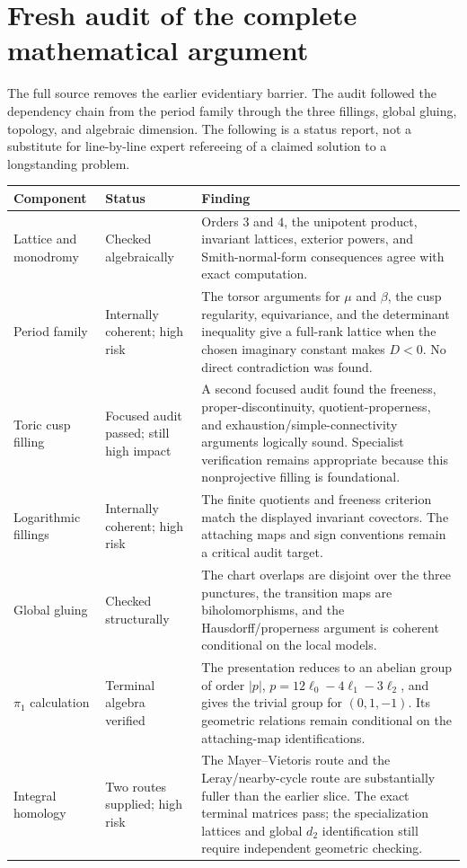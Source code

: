\documentclass[11pt]{article}
\begin{document}
\section{Fresh audit of the complete mathematical argument}

The full source removes the earlier evidentiary barrier. The audit followed the dependency chain from the period family through the three fillings, global gluing, topology, and algebraic dimension. The following is a status report, not a substitute for line-by-line expert refereeing of a claimed solution to a longstanding problem.

\begin{longtable}{@{}p{}p{}p{}@{}}
\toprule
Component & Status & Finding \\
\midrule
\endhead
Lattice and monodromy & Checked algebraically & Orders $3$ and $4$, the unipotent product, invariant lattices, exterior powers, and Smith-normal-form consequences agree with exact computation. \\
Period family & Internally coherent; high risk & The torsor arguments for $\mu$ and $\beta$, the cusp regularity, equivariance, and the determinant inequality give a full-rank lattice when the chosen imaginary constant makes $D<0$. No direct contradiction was found. \\
Toric cusp filling & Focused audit passed; still high impact & A second focused audit found the freeness, proper-discontinuity, quotient-properness, and exhaustion/simple-connectivity arguments logically sound. Specialist verification remains appropriate because this nonprojective filling is foundational. \\
Logarithmic fillings & Internally coherent; high risk & The finite quotients and freeness criterion match the displayed invariant covectors. The attaching maps and sign conventions remain a critical audit target. \\
Global gluing & Checked structurally & The chart overlaps are disjoint over the three punctures, the transition maps are biholomorphisms, and the Hausdorff/properness argument is coherent conditional on the local models. \\
$\pi_1$ calculation & Terminal algebra verified & The presentation reduces to an abelian group of order $|p|$, $p=12\ell_0-4\ell_1-3\ell_2$, and gives the trivial group for $(0,1,-1)$. Its geometric relations remain conditional on the attaching-map identifications. \\
Integral homology & Two routes supplied; high risk & The Mayer--Vietoris route and the Leray/nearby-cycle route are substantially fuller than the earlier slice. The exact terminal matrices pass; the specialization lattices and global $d_2$ identification still require independent geometric checking. \\

\end{longtable}
\end{document}
